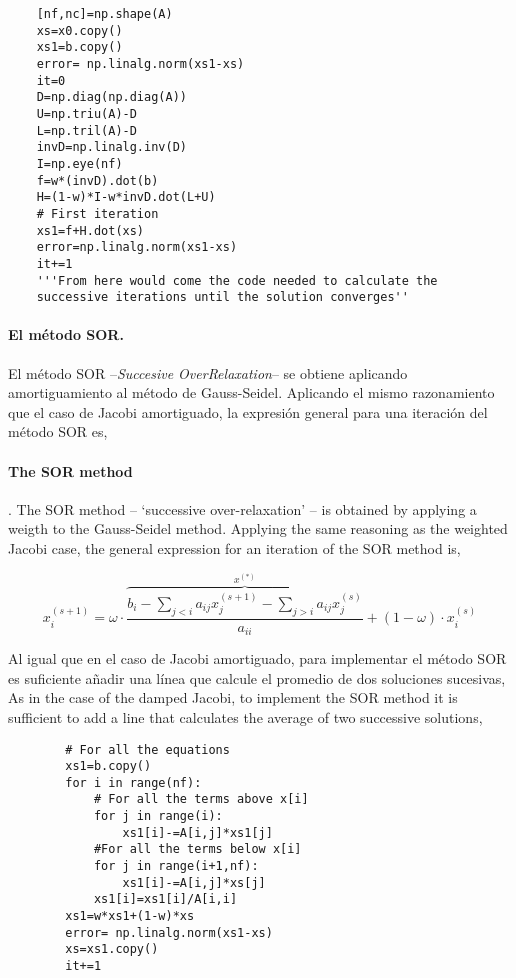 \begin{verbatim}
    [nf,nc]=np.shape(A)
    xs=x0.copy()
    xs1=b.copy()
    error= np.linalg.norm(xs1-xs)
    it=0
    D=np.diag(np.diag(A))
    U=np.triu(A)-D
    L=np.tril(A)-D
    invD=np.linalg.inv(D)
    I=np.eye(nf)
    f=w*(invD).dot(b)
    H=(1-w)*I-w*invD.dot(L+U)
    # First iteration
    xs1=f+H.dot(xs)
    error=np.linalg.norm(xs1-xs)
    it+=1
    '''From here would come the code needed to calculate the 
    successive iterations until the solution converges''

\end{verbatim}
\begin{paracol}{2}
\paragraph{El método SOR.} El método SOR --\emph{Succesive OverRelaxation}-- se obtiene aplicando amortiguamiento al método de Gauss-Seidel. Aplicando el mismo razonamiento que el caso de Jacobi amortiguado, la expresión general para una iteración del método SOR es,
\switchcolumn
\paragraph{The SOR method}. The SOR method -- ‘successive over-relaxation’ -- is obtained by applying a weigth to the Gauss-Seidel method. Applying the same reasoning as the weighted Jacobi case, the general expression for an iteration of the SOR method is,
\end{paracol}

\begin{equation*}
x_i^{(s+1)}=\omega\cdot \overbrace{\frac{b_i-\sum_{j< i}a_{ij}x_j^{(s+1)}-\sum_{j> i}a_{ij}x_j^{(s)}}{a_{ii}}}^{x^{(*)}}+(1-\omega)\cdot x_i^{(s)}
\end{equation*}

\begin{paracol}{2}

Al igual que en el caso de Jacobi amortiguado, para implementar el método SOR es suficiente añadir una línea que calcule el promedio de dos soluciones sucesivas,
\switchcolumn
As in the case of the damped Jacobi, to implement the SOR method it is sufficient to add a line that calculates the average of two successive solutions,
\end{paracol}

\begin{verbatim}
        # For all the equations
        xs1=b.copy()
        for i in range(nf):
            # For all the terms above x[i]
            for j in range(i):
                xs1[i]-=A[i,j]*xs1[j]
            #For all the terms below x[i]    
            for j in range(i+1,nf):
                xs1[i]-=A[i,j]*xs[j]
            xs1[i]=xs1[i]/A[i,i]
        xs1=w*xs1+(1-w)*xs
        error= np.linalg.norm(xs1-xs)
        xs=xs1.copy()
        it+=1
 
\end{verbatim}

